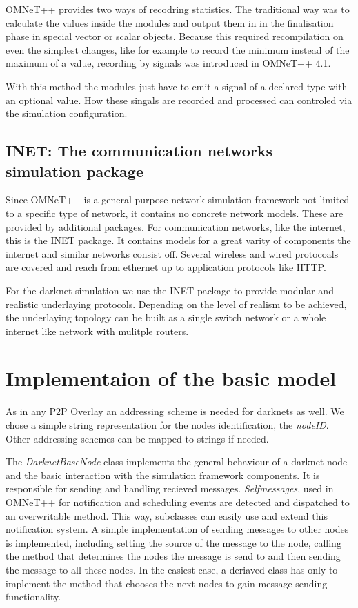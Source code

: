 OMNeT++ provides two ways of recodring statistics. The traditional way was to calculate the values inside the modules and output them in in the finalisation phase in special vector or scalar objects. Because this required recompilation on even the simplest changes, like for example to record the minimum instead of the maximum of a value, recording by signals was introduced in OMNeT++ 4.1.

With this method the modules just have to emit a signal of a declared type with an optional value. How these singals are recorded and processed can controled via the simulation configuration.

\subsection{INET: The communication networks simulation package}

Since OMNeT++ is a general purpose network simulation framework not limited to a specific type of network, it contains no concrete network models. These are provided by additional packages. For communication networks, like the internet, this is the INET package. It contains models for a great varity of components the internet and similar networks consist off. Several wireless and wired protocoals are covered and reach from ethernet up to application protocols like HTTP.

For the darknet simulation we use the INET package to provide modular and realistic underlaying protocols. Depending on the level of realism to be achieved, the underlaying topology can be built as a single switch network or a whole internet like network with mulitple routers.

\section{Implementaion of the basic model}

As in any P2P Overlay an addressing scheme is needed for darknets as well. We chose a simple string representation for the nodes identification, the \emph{nodeID}. Other addressing schemes can be mapped to strings if needed.

The \emph{DarknetBaseNode} class implements the general behaviour of a darknet node and the basic interaction with the simulation framework components. It is responsible for sending and handling recieved messages. \emph{Selfmessages}, used in OMNeT++ for notification and scheduling events are detected and dispatched to an overwritable method. This way, subclasses can easily use and extend this notification system. A simple implementation of sending messages to other nodes is implemented, including setting the source of the message to the node, calling the method that determines the nodes the message is send to and then sending the message to all these nodes. In the easiest case, a deriaved class has only to implement the method that chooses the next nodes to gain message sending functionality.

